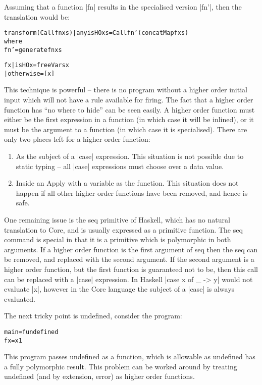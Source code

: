 \documentclass[preprint]{sigplanconf}
\newcommand{\C}[1]{\textsf{#1}}
\newenvironment{code}{\begin{alltt}\small}{\end{alltt}}
\begin{document}
Assuming that a function |fn| results in the specialised version |fn'|, then the translation would be:

\begin{code}
transform (Call fn xs) | any isHO xs = Call fn' (concatMap f xs)
    where
    fn' = generate fn xs

    f x  | isHO x     = freeVars x
         | otherwise  = [x]
\end{code}

This technique is powerful -- there is no program without a higher order initial input which will not have a rule available for firing. The fact that a higher order function has ``no where to hide'' can be seen easily. A higher order function must either be the first expression in a function (in which case it will be inlined), or it must be the argument to a function (in which case it is specialised). There are only two places left for a higher order function:

\begin{enumerate}
\item As the subject of a |case| expression. This situation is not possible due to static typing -- all |case| expressions must choose over a data value.

\item Inside an \C{Apply} with a variable as the function. This situation does not happen if all other higher order functions have been removed, and hence is safe.
\end{enumerate}

One remaining issue is the \C{seq} primitive of Haskell, which has no natural translation to Core, and is usually expressed as a primitive function. The \C{seq} command is special in that it is a primitive which is polymorphic in both arguments. If a higher order function is the first argument of \C{seq} then the \C{seq} can be removed, and replaced with the second argument. If the second argument is a higher order function, but the first function is guaranteed not to be, then this call can be replaced with a |case| expression. In Haskell |case x of _ -> y| would not evaluate |x|, however in the Core language the subject of a |case| is always evaluated.

The next tricky point is \C{undefined}, consider the program:

\begin{code}
main = f undefined
f x = x 1
\end{code}

This program passes \C{undefined} as a function, which is allowable as \C{undefined} has a fully polymorphic result. This problem can be worked around by treating \C{undefined} (and by extension, \C{error}) as higher order functions.
\end{document}
